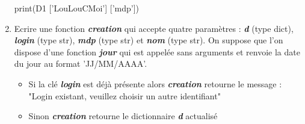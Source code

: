 \documentclass[12pt,french]{article}
\begin{document}
\begin{enumerate}
\begin{tcolorbox}[enhanced,colback=blue!5!white,colframe=blue!75!black]
\begin{pyverbatim}
print(D1 ['LouLouCMoi'] ['mdp'])
\end{pyverbatim}
\end{tcolorbox}	
\item Ecrire une fonction \textbf{\textsl{creation}} qui accepte quatre paramètres : \textbf{\textsl{d}} (type dict), \textbf{\textsl{login}} (type str),\textbf{\textsl{ mdp}} (type str) et \textbf{\textsl{nom}} (type
str). On suppose que l’on dispose d’une fonction \textbf{\textsl{jour}} qui est appelée sans arguments et renvoie la date du jour au format
’JJ/MM/AAAA’.
\begin{itemize}
\item Si la clé \textbf{\textsl{login}} est déjà présente alors \textbf{\textsl{creation}} retourne le message : "Login existant, veuillez choisir un autre
identifiant"
\item  Sinon \textbf{\textsl{creation}} retourne le dictionnaire \textbf{\textsl{d}} actualisé
\end{itemize}
	\end{enumerate}
\end{document}
